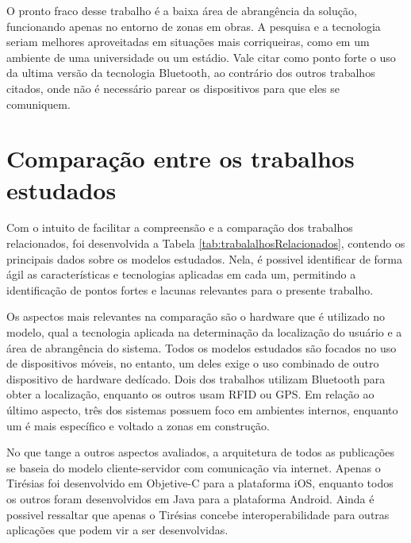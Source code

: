 \documentclass[english,brazilian]{UNISINOSmonografia}
\begin{document}
O pronto fraco desse trabalho é a baixa área de abrangência da solução, funcionando apenas no entorno de zonas em obras.
A pesquisa e a tecnologia seriam melhores aproveitadas em situações mais corriqueiras, como em um ambiente de uma universidade ou um estádio. Vale citar como ponto forte o uso da ultima versão da tecnologia Bluetooth, ao contrário dos outros trabalhos citados, onde não é necessário parear os dispositivos para que eles se comuniquem.

	\section{Comparação entre os trabalhos estudados}\label{comparacaoTrabs}

Com o intuito de facilitar a compreensão e a comparação dos trabalhos relacionados, foi desenvolvida a Tabela \ref{tab:trabalalhosRelacionados}, contendo os principais dados sobre os modelos estudados. Nela, é possivel identificar de forma ágil as características e tecnologias aplicadas em cada um, permitindo a identificação de pontos fortes e lacunas relevantes para o presente trabalho.

Os aspectos mais relevantes na comparação são o hardware que é utilizado no modelo, qual a tecnologia aplicada na determinação da localização do usuário e a área de abrangência do sistema. Todos os modelos estudados são focados no uso de dispositivos móveis, no entanto, um deles exige o uso combinado de outro dispositivo de hardware dedícado. Dois dos trabalhos utilizam Bluetooth para obter a localização, enquanto os outros usam RFID ou GPS. Em relação ao último aspecto, três dos sistemas possuem foco em ambientes internos, enquanto um é mais específico e voltado a zonas em construção.

No que tange a outros aspectos avaliados, a arquitetura de todos as publicações se baseia do modelo cliente-servidor com comunicação via internet. Apenas o Tirésias foi desenvolvido em Objetive-C para a plataforma iOS, enquanto todos os outros foram desenvolvidos em Java para a plataforma Android. Ainda é possivel ressaltar que apenas o Tirésias concebe interoperabilidade para outras aplicações que podem vir a ser desenvolvidas.
\end{document}

